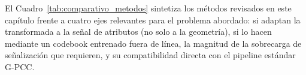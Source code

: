 
    El Cuadro~\ref{tab:comparativo_metodos} sintetiza los métodos revisados en este
    capítulo frente a cuatro ejes relevantes para el problema abordado: si adaptan la
    transformada a la señal de atributos (no solo a la geometría), si lo hacen mediante un
    codebook entrenado fuera de línea, la magnitud de la sobrecarga de señalización que
    requieren, y su compatibilidad directa con el pipeline estándar G-PCC.

